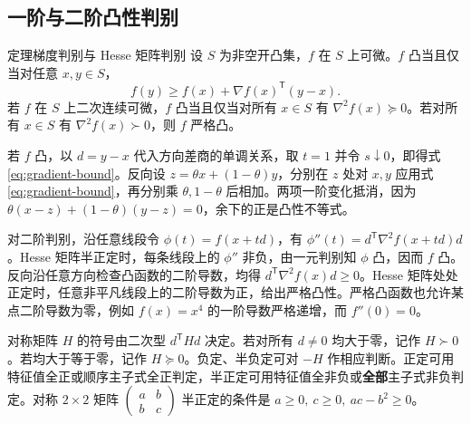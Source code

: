 \documentclass[UTF8,fontset=none,zihao=-4,a4paper]{ctexart}
\newcommand{\term}[1]{\textbf{#1}}
\newcommand{\transpose}{^{\mathsf T}}
\begin{document}
\subsection{一阶与二阶凸性判别}
\begin{infobox}{定理\quad 梯度判别与 Hesse 矩阵判别}
设 $S$ 为非空开凸集，$f$ 在 $S$ 上可微。$f$ 凸当且仅当对任意 $x,y\in S$，
\begin{equation}\label{eq:gradient-bound}
 f(y)\ge f(x)+\nabla f(x)\transpose(y-x).
\end{equation}
若 $f$ 在 $S$ 上二次连续可微，$f$ 凸当且仅当对所有 $x\in S$ 有 $\nabla^2 f(x)\succeq0$。若对所有 $x\in S$ 有 $\nabla^2 f(x)\succ0$，则 $f$ 严格凸。
\end{infobox}

若 $f$ 凸，以 $d=y-x$ 代入方向差商的单调关系，取 $t=1$ 并令 $s\downarrow0$，即得式 \eqref{eq:gradient-bound}。反向设 $z=\theta x+(1-\theta)y$，分别在 $z$ 处对 $x,y$ 应用式 \eqref{eq:gradient-bound}，再分别乘 $\theta,1-\theta$ 后相加。两项一阶变化抵消，因为 $\theta(x-z)+(1-\theta)(y-z)=0$，余下的正是凸性不等式。

对二阶判别，沿任意线段令 $\phi(t)=f(x+td)$，有 $\phi''(t)=d\transpose\nabla^2 f(x+td)d$。Hesse 矩阵半正定时，每条线段上的 $\phi''$ 非负，由一元判别知 $\phi$ 凸，因而 $f$ 凸。反向沿任意方向检查凸函数的二阶导数，均得 $d\transpose\nabla^2 f(x)d\ge0$。Hesse 矩阵处处正定时，任意非平凡线段上的二阶导数为正，给出严格凸性。严格凸函数也允许某点二阶导数为零，例如 $f(x)=x^4$ 的一阶导数严格递增，而 $f''(0)=0$。

对称矩阵 $H$ 的符号由二次型 $d\transpose Hd$ 决定。若对所有 $d\ne0$ 均大于零，记作 $H\succ0$。若均大于等于零，记作 $H\succeq0$。负定、半负定可对 $-H$ 作相应判断。正定可用特征值全正或顺序主子式全正判定，半正定可用特征值全非负或\term{全部}主子式非负判定。对称 $2\times2$ 矩阵 $\begin{pmatrix}a&b\\b&c\end{pmatrix}$ 半正定的条件是 $a\ge0,\ c\ge0,\ ac-b^2\ge0$。
\end{document}
